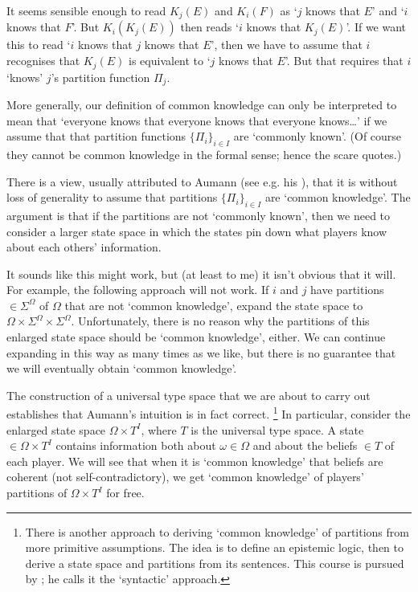 \documentclass[11pt,letterpaper,reqno,oneside]{article}
\begin{document}
It seems sensible enough to read $K_j(E)$ and $K_i(F)$ as `$j$ knows that $E$' and `$i$ knows that $F$'. But $K_i( K_j(E) )$ then reads `$i$ knows that $K_j(E)$'. If we want this to read `$i$ knows that $j$ knows that $E$', then we have to assume that $i$ recognises that $K_j(E)$ is equivalent to `$j$ knows that $E$'. But that requires that $i$ `knows' $j$'s partition function $\Pi_j$.

More generally, our definition of common knowledge can only be interpreted to mean that `everyone knows that everyone knows that everyone knows\dots' if we assume that that partition functions $\{ \Pi_i \}_{i \in I}$ are `commonly known'. (Of course they cannot be common knowledge in the formal sense; hence the scare quotes.)

There is a view, usually attributed to Aumann (see e.g. his \citeyear{Aumann1999I}), that it is without loss of generality to assume that partitions $\{ \Pi_i \}_{i \in I}$ are `common knowledge'. The argument is that if the partitions are not `commonly known', then we need to consider a larger state space in which the states pin down what players know about each others' information.

It sounds like this might work, but (at least to me) it isn't obvious that it will. For example, the following approach will not work. If $i$ and $j$ have partitions $\in \Sigma^\Omega$ of $\Omega$ that are not `common knowledge', expand the state space to $\Omega \times \Sigma^\Omega \times \Sigma^\Omega$. Unfortunately, there is no reason why the partitions of this enlarged state space should be `common knowledge', either. We can continue expanding in this way as many times as we like, but there is no guarantee that we will eventually obtain `common knowledge'.

The construction of a universal type space that we are about to carry out establishes that Aumann's intuition is in fact correct.%
	\footnote{There is another approach to deriving `common knowledge' of partitions from more primitive assumptions. The idea is to define an epistemic logic, then to derive a state space and partitions from its sentences. This course is pursued by \textcite{Aumann1999I}; he calls it the `syntactic' approach.}
In particular, consider the enlarged state space $\Omega \times T^I$, where $T$ is the universal type space. A state $\in \Omega \times T^I$ contains information both about $\omega \in \Omega$ and about the beliefs $\in T$ of each player. We will see that when it is `common knowledge' that beliefs are coherent (not self-contradictory), we get `common knowledge' of players' partitions of $\Omega \times T^I$ for free.
\end{document}
